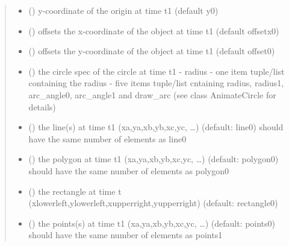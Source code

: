 \documentclass[letterpaper,10pt,english]{sphinxmanual}
\begin{document}
\begin{fulllineitems}
\begin{fulllineitems}
\begin{quote}
\begin{description}
\begin{itemize}
\item {} 
 () \textendash{} y-coordinate of the origin at time t1 (default y0)

\item {} 
 () \textendash{} offsets the x-coordinate of the object at time t1 (default offsetx0)

\item {} 
 () \textendash{} offsets the y-coordinate of the object at time t1 (default offset0)

\item {} 
 () \textendash{} the circle spec of the circle at time t1 
- radius 
- one item tuple/list containing the radius 
- five items tuple/list cntaining radius, radius1, arc\_angle0, arc\_angle1 and draw\_arc
(see class AnimateCircle for details)

\item {} 
 () \textendash{} the line(s) at time t1 (xa,ya,xb,yb,xc,yc, …) (default: line0) 
should have the same number of elements as line0

\item {} 
 () \textendash{} the polygon at time t1 (xa,ya,xb,yb,xc,yc, …) (default: polygon0) 
should have the same number of elements as polygon0

\item {} 
 () \textendash{} the rectangle at time t (xlowerleft,ylowerleft,xupperright,yupperright)
(default: rectangle0) 

\item {} 
 () \textendash{} the points(s) at time t1 (xa,ya,xb,yb,xc,yc, …) (default: points0) 
should have the same number of elements as points1


\end{itemize}
\end{description}
\end{quote}
\end{fulllineitems}
\end{fulllineitems}
\end{document}
